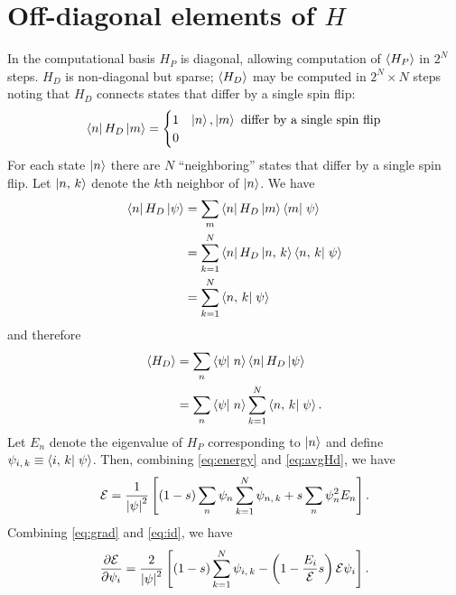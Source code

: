 \section{Off-diagonal elements of $H$}
In the computational basis $H_P$ is diagonal, allowing computation of
$\left< H_P \right>$ in $2^N$ steps. $H_D$ is non-diagonal but sparse; $\left< H_D \right>$ may
be computed in $2^N \times N$ steps noting that $H_D$ connects states that
differ by a single spin flip:
\begin{equation}
  \matrixel{n}{H_D}{m}
  = \begin{cases}
    1 & \ket{n}, \ket{m} \text{ differ by a single spin flip} \\
    0
  \end{cases}
  \label{}
\end{equation}
For each state $\left| n \right>$ there are $N$ ``neighboring'' states that differ by a
single spin flip. Let $\left| n,\,k \right>$ denote the $k$th neighbor of
$\left| n \right>$. We have
\begin{align}
  \matrixel{n}{H_D}{\psi}
  &= \sum_m \matrixel{n}{H_D}{m} \braket{m}{\psi} \\
  &= \sum_{k=1}^N \matrixel{n}{H_D}{\nghbr{n}{k}} \braket{\nghbr{n}{k}}{\psi} \\
  &= \sum_{k=1}^N \braket{\nghbr{n}{k}}{\psi}
  \label{eq:id}
\end{align}
and therefore
\begin{align}
  \avg{H_D}
  &= \sum_n \braket{\psi}{n} \matrixel{n}{H_D}{\psi} \\
  &= \sum_n \braket{\psi}{n} \sum_{k=1}^{N} \braket{\nghbr{n}{k}}{\psi}.
  \label{eq:avgHd}
\end{align}
Let $E_n$ denote the eigenvalue of $H_P$ corresponding to $\left| n \right>$ and define
$\psi_{\nghbr{i}{k}} \equiv \braket{\nghbr{i}{k}}{\psi}$.
Then, combining \eqref{eq:energy} and \eqref{eq:avgHd}, we have
\begin{equation}
  \mathcal{E}
  = \frac{1}{\left| \psi \right|^2}
  \left[
  (1-s) \sum_n \psi_n \sum_{k=1}^N \psi_{n,\,k}
  + s \sum_n \psi_n^2 E_n
  \right].
  \label{}
\end{equation}
Combining \eqref{eq:grad} and \eqref{eq:id}, we have 
\begin{equation}
  \frac{\partial \mathcal{E}}{\partial \psi_i}
  = \frac{2}{\left| \psi \right|^2}
  \left[
      (1-s) \sum_{k=1}^N \psi_{i,\,k}
    - \left( 1 - \frac{E_i}{\mathcal{E}} s \right) \mathcal{E} \psi_i
  \right].
\end{equation}


